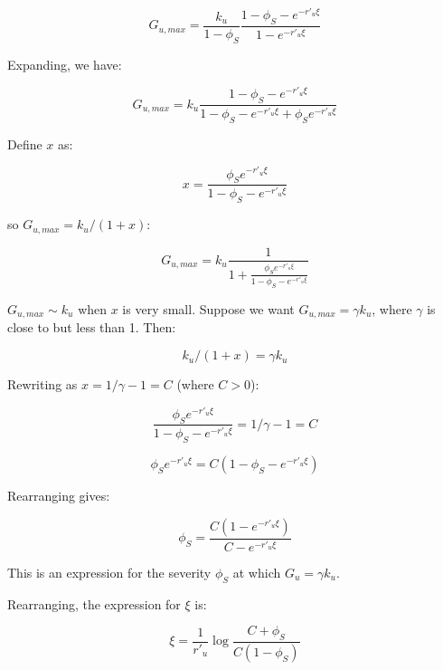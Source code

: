 \documentclass{article}
\begin{document}
\begin{equation}
  G_{u,max} =  \frac{k_u }{1-\phi_S}   \frac{1- \phi_S - e^{-r'_u \xi} }{1 - e^{-r'_u \xi}}
  \label{G_u_max}
\end{equation}

Expanding, we have:

\begin{equation}
  G_{u,max} =  k_u  \frac{1- \phi_S - e^{-r'_u \xi} }{1  - \phi_S - e^{-r'_u \xi} + \phi_S  e^{-r'_u \xi}}
\end{equation}


Define $x$ as:

\begin{equation}
x = \frac{ \phi_S  e^{-r'_u \xi}}{1- \phi_S - e^{-r'_u \xi}}
\end{equation}

so $ G_{u,max} = k_u /(1+x)$:

\begin{equation}
G_{u,max}  = k_u \frac{1}{1 + \frac{ \phi_S  e^{-r'_u \xi}}{1- \phi_S - e^{-r'_u \xi}}}
\end{equation}


$G_{u,max} \sim k_u$ when $x$ is very small.
Suppose we want $G_{u,max} = \gamma k_u$, where $\gamma$ is close to but less than 1.  Then:


\begin{equation}
 k_u /(1+x) = \gamma k_u
\end{equation}

Rewriting as  $x = 1/\gamma  - 1= C$ (where $C> 0$):

\begin{equation}
 \frac{ \phi_S  e^{-r'_u \xi}}{1- \phi_S - e^{-r'_u \xi}} =  1/\gamma  - 1 = C
\end{equation}

\begin{equation}
{ \phi_S  e^{-r'_u \xi}} = C ({1- \phi_S - e^{-r'_u \xi}} )
\end{equation}

Rearranging gives:

\begin{equation}
 \phi_S   =  \frac{C(1 - e^{-r'_u \xi})}{C  - e^{-r'_u \xi}}
 \label{phi_S_RI}
 \end{equation}

This is an expression for the severity $ \phi_S $ at which $G_u = \gamma k_u$.

Rearranging, the expression for $\xi$ is:


\begin{equation}
\xi   =  \frac{1}{r'_u}\log \frac{C  +\phi_S } {C(1 - \phi_S)}
 \label{RI_phi_S}
 \end{equation}
\end{document}
